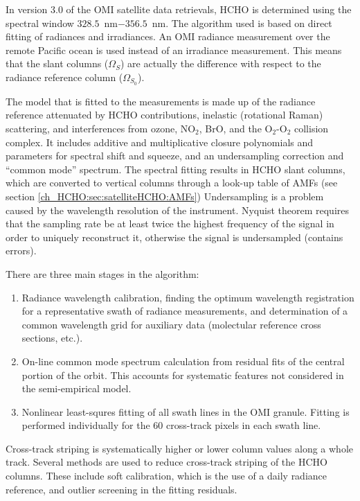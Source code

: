     In version 3.0 of the OMI satellite data retrievals, HCHO is determined using the spectral window $328.5$~nm$ - 356.5$~nm. 
    The algorithm used is based on direct fitting of radiances and irradiances.
    An OMI radiance measurement over the remote Pacific ocean is used instead of an irradiance measurement.
    This means that the slant columns ($\Omega_S$) are actually the difference with respect to the radiance reference column ($\Omega_{S_0}$).
    
    The model that is fitted to the measurements is made up of the radiance reference attenuated by HCHO contributions, inelastic (rotational Raman) scattering, and interferences from ozone, NO$_2$, BrO, and the O$_2$-O$_2$ collision complex.
    It includes additive and multiplicative closure polynomials and parameters for spectral shift and squeeze, and an undersampling correction and ``common mode'' spectrum.
    The spectral fitting results in HCHO slant columns, which are converted to vertical columns through a look-up table of AMFs (see section \ref{ch_HCHO:sec:satelliteHCHO:AMFs})
    Undersampling is a problem caused by the wavelength resolution of the instrument.
    Nyquist theorem requires that the sampling rate be at least twice the highest frequency of the signal in order to uniquely reconstruct it, otherwise the signal is undersampled (contains errors).
    
    There are three main stages in the algorithm:
    \begin{enumerate}
     \item Radiance wavelength calibration, finding the optimum wavelength registration for a representative swath of radiance measurements, and determination of a common wavelength grid for auxiliary data (molectular reference cross sections, etc.).
     \item On-line common mode spectrum calculation from residual fits of the central portion of the orbit. 
     This accounts for systematic features not considered in the semi-empirical model.
     \item Nonlinear least-squres fitting of all swath lines in the OMI granule. 
     Fitting is performed individually for the 60 cross-track pixels in each swath line.
    \end{enumerate}
    
    Cross-track striping is systematically higher or lower column values along a whole track.
    Several methods are used to reduce cross-track striping of the HCHO columns.
    These include soft calibration, which is the use of a daily radiance reference, and outlier screening in the fitting residuals.
    
